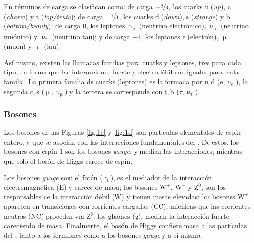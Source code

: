 En términos de carga \color{vero} se clasifican \color{norm} como:  de carga $+\sfrac{2}{3}$, los cuarks u (\emph{up}), c  (\emph{charm}) y t (\emph{top/truth}); de carga $-\sfrac{1}{3}$, los cuarks $\mathrm{d}$ (\emph{down}), $\mathrm{s}$ (\emph{strange}) y $\mathrm{b}$ (\emph{bottom/beauty}); de carga $0$, los leptones $\upnu_{\text{e}}$ (neutrino electrónico), $\upnu_{\upmu}$ (neutrino muónico) y $\upnu_{\uptau}$ (neutrino tau); y de carga $-1$, los leptones $\text{e}$ (electrón), $\upmu$ (muón) y $\uptau$ (tau).

Así mismo, existen las llamadas familias para cuarks y leptones, tres para cada tipo, de forma que las interacciones fuerte y electrodébil son iguales para cada familia. La primera familia de cuarks (leptones) es la formada por $\mathrm{u,d}$ ($\text{e},\upnu_e$), la segunda $\mathrm{c,s}$ ($\upmu,\upnu_{\upmu}$) y la tercera se corresponde con $\mathrm{t,b}$ ($\tau,\upnu_{\uptau}$).



\subsubsection{Bosones} %

\color{dieg}
Los bosones de las \color{vero} Figuras \ref{fig:1c} y \ref{fig:1d} \color{norm} son partículas elementales de espín entero, y que se asocian con las interacciones fundamentales del \stdmod. De estos, los bosones con espín \color{vero} $1$ \color{norm} son los bosones \emph{gauge}, y median las interacciones; mientras que solo el bosón de Higgs carece de espín. \color{norm}
  
Los bosones \emph{gauge} son: el fotón ($\upgamma$), es el mediador de la interacción electromagnética (E) y carece de masa; los bosones $\mathrm{W^+}$, $\mathrm{W^-}$ y $\mathrm{Z^0}$, son los responsables de la interacción débil (W) y tienen masas elevadas: los bosones $\mathrm{W^{\pm}}$ aparecen en transiciones con corrientes cargadas (CC), mientras que las corrientes neutras (NC) proceden vía $\mathrm{Z^0}$; los gluones ($\mathrm{g}$), median la interacción fuerte careciendo de masa.
%
\color{dieg}
Finalmente, el bosón de Higgs \color{vero} confiere  masa a las partículas del \stdmod, tanto a los fermiones como a los bosones \emph{gauge} y a sí mismo. \color{norm}


